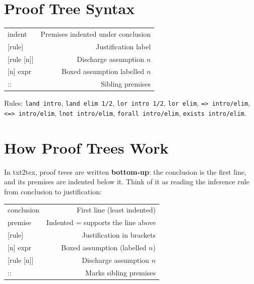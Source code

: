 \documentclass[10pt,landscape,a4paper]{article}
\begin{document}
\vspace{-2pt}

\begin{multicols}{3}
\raggedcolumns

\section{Proof Tree Syntax}

\begin{tabularx}{\columnwidth}{LR}
\textrm{indent}      & Premises indented under conclusion \\
{[rule]}              & Justification label \\
{[rule {[n]}]}        & Discharge assumption $n$ \\
{[n] expr}            & Boxed assumption labelled $n$ \\
::                    & Sibling premises \\
\end{tabularx}

\smallskip
{\footnotesize Rules: \texttt{land intro}, \texttt{land elim 1/2}, \texttt{lor intro 1/2}, \texttt{lor elim}, \texttt{=> intro/elim}, \texttt{<=> intro/elim}, \texttt{lnot intro/elim}, \texttt{forall intro/elim}, \texttt{exists intro/elim}.}

\section{How Proof Trees Work}

{\scriptsize
In txt2tex, proof trees are written \textbf{bottom-up}: the conclusion is the first line, and its premises are indented below it. Think of it as reading the inference rule from conclusion to justification:

\smallskip
\begin{tabularx}{\columnwidth}{LR}
\textrm{conclusion}  & First line (least indented) \\
\textrm{\quad premise}& Indented = supports the line above \\
{[rule]}              & Justification in brackets \\
{[n] expr}            & Boxed assumption (labelled $n$) \\
{[rule {[n]}]}        & Discharge assumption $n$ \\
::                    & Marks sibling premises \\
\end{tabularx}

}
\end{multicols}
\end{document}
